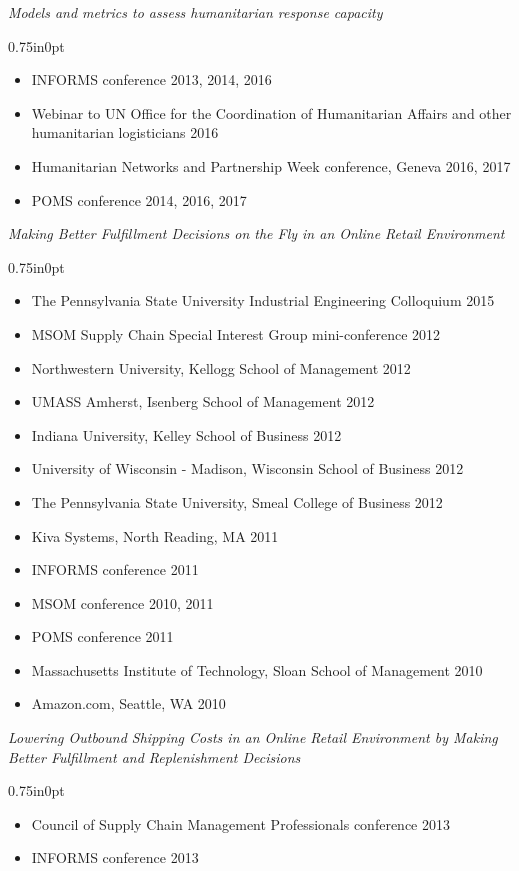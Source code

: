 \documentclass[letterpaper,11pt,oneside]{article}
\newcommand\myIndent{0.75in}
\newcommand\myParSkip{3pt}
\newcommand\myHangIndent{1in}
\newcommand{\NiceIndent}{ \parindent=\myIndent \hangindent=\myHangIndent }
\newenvironment{miniListBullet}
    {
        \begin{adjustwidth}{\myIndent}{0pt}
        \setlength{\parskip}{0pt}%
        \renewcommand\labelitemi{{\boldmath$\cdot$}}
        \begin{itemize}
        \setlength\itemsep{0em}
    }
    {
        \end{itemize}
        \setlength{\parskip}{\myParSkip}%
        \end{adjustwidth}
    }
\begin{document}
\NiceIndent \textit{Models and metrics to assess humanitarian response capacity}
\begin{miniListBullet}
    \item INFORMS conference 2013, 2014, 2016
    \item Webinar to UN Office for the Coordination of Humanitarian Affairs and other humanitarian logisticians 2016
    \item Humanitarian Networks and Partnership Week conference, Geneva 2016, 2017
    \item POMS conference 2014, 2016, 2017
\end{miniListBullet}



\NiceIndent \textit{Making Better Fulfillment Decisions on the Fly in an Online Retail Environment}
\begin{miniListBullet}
    \item The Pennsylvania State University Industrial Engineering Colloquium 2015
    \item MSOM Supply Chain Special Interest Group mini-conference 2012
    \item Northwestern University, Kellogg School of Management 2012
    \item UMASS Amherst, Isenberg School of Management 2012
    \item Indiana University, Kelley School of Business 2012
    \item University of Wisconsin - Madison, Wisconsin School of Business 2012
    \item The Pennsylvania State University, Smeal College of Business 2012
    \item Kiva Systems, North Reading, MA 2011
    \item INFORMS conference 2011
    \item MSOM conference 2010, 2011
    \item POMS conference 2011
    \item Massachusetts Institute of Technology, Sloan School of Management 2010
    \item Amazon.com, Seattle, WA 2010
\end{miniListBullet}    
    
\NiceIndent \textit{Lowering Outbound Shipping Costs in an Online Retail Environment by Making Better Fulfillment and Replenishment Decisions}
\begin{miniListBullet}
    \item Council of Supply Chain Management Professionals conference 2013
    \item INFORMS conference 2013
\end{miniListBullet}
\end{document}
